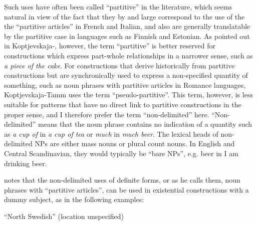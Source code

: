 \begin{styleBodytextC}
Such uses have often been called “partitive” in the literature, which seems natural in view of the fact that they by and large correspond to the use of the the “partitive articles” in French and Italian, and also are generally translatable by the partitive case in languages such as Finnish and Estonian. As pointed out in Koptjevskaja-\citet[525]{Tamm2001}, however, the term “partitive” is better reserved for constructions which express part-whole relationships in a narrower sense, such as \textit{a piece of the cake}. For constructions that derive historically from partitive constructions but are synchronically used to express a non-specified quantity of something, such as noun phrases with partitive articles in Romance languages, Koptjevskaja-Tamm uses the term “pseudo-partitive”. This term, however, is less suitable for patterns that have no direct link to partitive constructions in the proper sense, and I therefore prefer the term “non-delimited” here. “Non-delimited” means that the noun phrase contains no indication of a quantity such as \textit{a cup of} in \textit{a cup of tea }or \textit{much} in \textit{much beer}. The lexical heads of non-delimited NPs are either mass nouns or plural count nouns. In English and Central Scandinavian, they would typically be “bare NPs”, e.g. beer in I am drinking beer. 

\end{styleBodytextC}

\begin{styleBodytextC}
\citet[51]{Delsing1993} notes that the non-delimited uses of definite forms, or as he calls them, noun phrases with “partitive articles”, can be used in existential constructions with a dummy subject, as in the following examples: 

\end{styleBodytextC}


\begin{listWWNumileveli}
\item {}

\begin{styleExample}
“North Swedish” (location unspecified)

\end{styleExample}

\end{listWWNumileveli}

\begin{listWWNumxxiiileveli}
\item {}

\end{listWWNumxxiiileveli}

